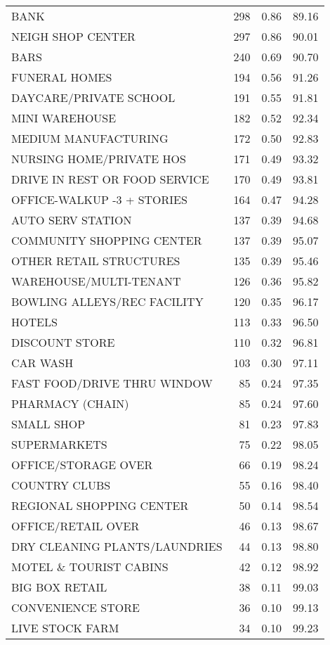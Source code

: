 \documentclass[
]{book}
\theoremstyle{definition}
\theoremstyle{definition}
\theoremstyle{definition}
\theoremstyle{definition}
\theoremstyle{remark}
\begin{document}
\begin{table}
\begin{tabular}[t]{lrrr}
\addlinespace
BANK & 298 & 0.86 & 89.16\\
NEIGH SHOP CENTER & 297 & 0.86 & 90.01\\
BARS & 240 & 0.69 & 90.70\\
FUNERAL HOMES & 194 & 0.56 & 91.26\\
DAYCARE/PRIVATE SCHOOL & 191 & 0.55 & 91.81\\
\addlinespace
MINI WAREHOUSE & 182 & 0.52 & 92.34\\
MEDIUM MANUFACTURING & 172 & 0.50 & 92.83\\
NURSING HOME/PRIVATE HOS & 171 & 0.49 & 93.32\\
DRIVE IN REST OR FOOD SERVICE & 170 & 0.49 & 93.81\\
OFFICE-WALKUP -3 + STORIES & 164 & 0.47 & 94.28\\
\addlinespace
AUTO SERV STATION & 137 & 0.39 & 94.68\\
COMMUNITY SHOPPING CENTER & 137 & 0.39 & 95.07\\
OTHER RETAIL STRUCTURES & 135 & 0.39 & 95.46\\
WAREHOUSE/MULTI-TENANT & 126 & 0.36 & 95.82\\
BOWLING ALLEYS/REC FACILITY & 120 & 0.35 & 96.17\\
\addlinespace
HOTELS & 113 & 0.33 & 96.50\\
DISCOUNT STORE & 110 & 0.32 & 96.81\\
CAR WASH & 103 & 0.30 & 97.11\\
FAST FOOD/DRIVE THRU WINDOW & 85 & 0.24 & 97.35\\
PHARMACY (CHAIN) & 85 & 0.24 & 97.60\\
\addlinespace
SMALL SHOP & 81 & 0.23 & 97.83\\
SUPERMARKETS & 75 & 0.22 & 98.05\\
OFFICE/STORAGE OVER & 66 & 0.19 & 98.24\\
COUNTRY CLUBS & 55 & 0.16 & 98.40\\
REGIONAL SHOPPING CENTER & 50 & 0.14 & 98.54\\
\addlinespace
OFFICE/RETAIL OVER & 46 & 0.13 & 98.67\\
DRY CLEANING PLANTS/LAUNDRIES & 44 & 0.13 & 98.80\\
MOTEL \& TOURIST CABINS & 42 & 0.12 & 98.92\\
BIG BOX RETAIL & 38 & 0.11 & 99.03\\
CONVENIENCE STORE & 36 & 0.10 & 99.13\\
\addlinespace
LIVE STOCK FARM & 34 & 0.10 & 99.23\\

\end{tabular}
\end{table}
\end{document}
